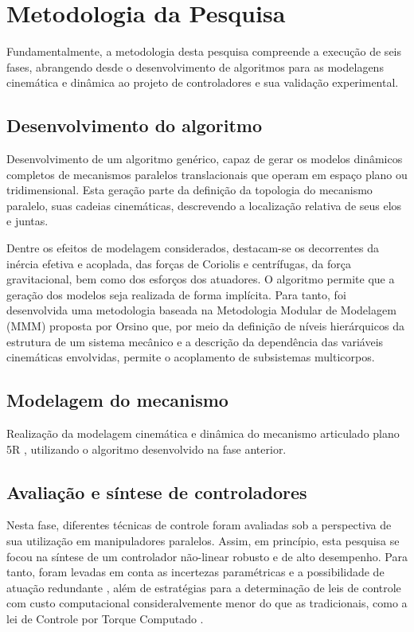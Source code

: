 \documentclass[]{politex}
\begin{document}
\chapter{Metodologia da Pesquisa}\label{method}

Fundamentalmente, a metodologia desta pesquisa compreende a execução de seis fases, abrangendo desde o desenvolvimento de algoritmos para as modelagens cinemática e dinâmica ao projeto de controladores e sua validação experimental.

\section{Desenvolvimento do algoritmo} 
Desenvolvimento de um algoritmo genérico, capaz de gerar os modelos dinâmicos completos de mecanismos paralelos translacionais que operam em espaço plano ou tridimensional. Esta geração parte da definição da topologia do mecanismo paralelo, suas cadeias cinemáticas, descrevendo a localização relativa de seus elos e juntas.

Dentre os efeitos de modelagem considerados, destacam-se os decorrentes da inércia efetiva e acoplada, das forças de Coriolis e centrífugas, da força gravitacional, bem como dos esforços dos atuadores. O algoritmo permite que a geração dos modelos seja realizada de forma implícita. Para tanto, foi desenvolvida uma metodologia baseada na Metodologia Modular de Modelagem (MMM) proposta por Orsino \cite{23orsino} que, por meio da definição de níveis hierárquicos da estrutura de um sistema mecânico e a descrição da dependência das variáveis cinemáticas envolvidas,  permite o acoplamento de subsistemas multicorpos.

\section{Modelagem do mecanismo} 
Realização da modelagem cinemática e dinâmica do mecanismo articulado plano 5R \cite{22orsino}, utilizando o algoritmo desenvolvido na fase anterior.

\section{Avaliação e síntese de controladores} 
Nesta fase, diferentes técnicas de controle foram avaliadas sob a perspectiva de sua utilização em manipuladores paralelos. Assim, em princípio, esta pesquisa se focou na síntese de um controlador não-linear robusto e de alto desempenho. Para tanto, foram levadas em conta as incertezas paramétricas e a possibilidade de atuação redundante \cite{Cheng}, além de estratégias para a determinação de leis de controle com custo computacional consideralvemente menor do que as tradicionais, como a lei de Controle por Torque Computado \cite{Craig, Zubizarreta}.
\end{document}
